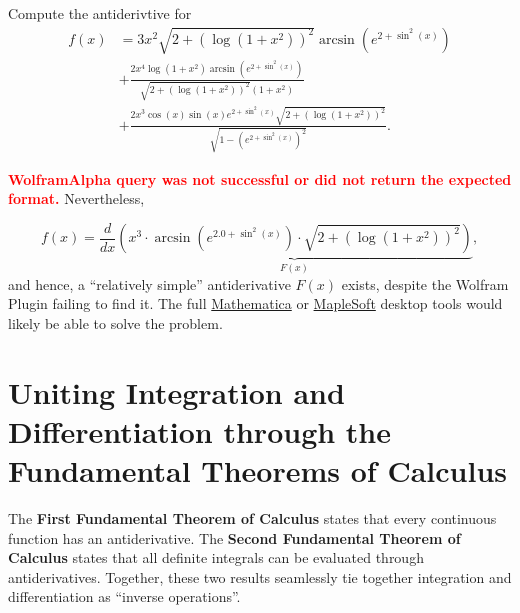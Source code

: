 \begin{example}  Compute the antiderivtive for 
    \begin{equation}
    \begin{aligned}
        f(x) &= 3  x^{2 } \sqrt{2  + \left( \log\left( 1  + x^{2 } \right) \right)^{2 }} \arcsin\left( e^{2  + \sin^{2 }\left( x \right)} \right) \\[1em]
        & + \frac{2  x^{4 } \log\left( 1  + x^{2 } \right) \arcsin\left( e^{2  + \sin^{2 }\left( x \right)} \right)}{\sqrt{2  + \left( \log\left( 1  + x^{2 } \right) \right)^{2 }} \left( 1  + x^{2 } \right)} \\[1em]
        & + \frac{2  x^{3 } \cos\left( x \right) \sin\left( x \right) e^{2  + \sin^{2 }\left( x \right)} \sqrt{2  + \left( \log\left( 1  + x^{2 } \right) \right)^{2 }}}{\sqrt{1  - \left( e^{2  + \sin^{2 }\left( x \right)} \right)^{2 }}}.
    \end{aligned}
\end{equation}
\end{example}

\solution \textcolor{red}{\bf WolframAlpha query was not successful or did not return the expected format.} Nevertheless, 

\begin{equation}
f(x) =  \frac{ d}{dx} \underbrace{\left(  x^{3} \cdot \arcsin\left( e^{2.0 + \sin^{2}\left( x \right)} \right) \cdot \sqrt{2 + \left( \log\left( 1 + x^{2} \right) \right)^{2}} \right)}_{F(x)},
\end{equation}
and hence, a ``relatively simple'' antiderivative $F(x)$ exists, despite the Wolfram Plugin failing to find it. The full \href{https://www.wolfram.com/mathematica/}{Mathematica} or \href{https://www.maplesoft.com/products/Maple/}{MapleSoft} desktop tools would likely be able to solve the problem.
\Qed




\section{Uniting Integration and Differentiation through the Fundamental Theorems of Calculus}

The \textbf{First Fundamental Theorem of Calculus} states that every continuous function has an antiderivative. The \textbf{Second Fundamental Theorem of Calculus} states that all definite integrals can be evaluated through antiderivatives. Together, these two results seamlessly tie together integration and differentiation as ``inverse operations''. 

